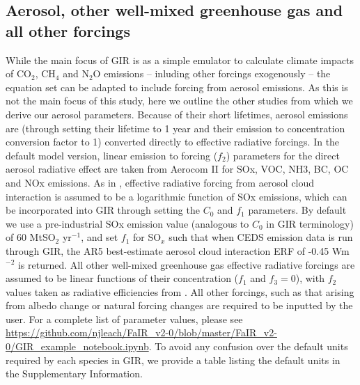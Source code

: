 \documentclass[gmd, manuscript]{copernicus}
\begin{document}
\subsection*{Aerosol, other well-mixed greenhouse gas and all other forcings}
While the main focus of GIR is as a simple emulator to calculate climate impacts of CO$_2$, CH$_4$ and N$_2$O emissions -- inluding other forcings exogenously -- the equation set can be adapted to include forcing from aerosol emissions. As this is not the main focus of this study, here we outline the other studies from which we derive our aerosol parameters. Because of their short lifetimes, aerosol emissions are (through setting their lifetime to 1 year and their emission to concentration conversion factor to 1) converted directly to effective radiative forcings. In the default model version, linear emission to forcing ($f_2$) parameters for the direct aerosol radiative effect are taken from Aerocom II \citep{Myhre2013a} for SOx, VOC, NH3, BC, OC and NOx emissions. As in \cite{Stevens2015}, effective radiative forcing from aerosol cloud interaction is assumed to be a logarithmic function of SOx emissions, which can be incorporated into GIR through setting the $C_0$ and $f_1$ parameters. By default we use a pre-industrial SOx emission value (analogous to $C_0$ in GIR terminology) of 60 MtSO$_2$ yr$^{-1}$, and set $f_1$ for SO$_x$ such that when CEDS emission data is run through GIR, the AR5 best-estimate aerosol cloud interaction ERF of -0.45 Wm$^{-2}$ is returned. All other well-mixed greenhouse gas effective radiative forcings are assumed to be linear functions of their concentration ($f_1$ and $f_3 = 0$), with $f_2$ values taken as radiative efficiencies from \cite{Etminan}.  All other forcings, such as that arising from albedo change or natural forcing changes are required to be inputted by the user. For a complete list of parameter values, please see \url{https://github.com/njleach/FaIR_v2-0/blob/master/FaIR_v2-0/GIR_example_notebook.ipynb}. To avoid any confusion over the default units required by each species in GIR, we provide a table listing the default units in the Supplementary Information.
\end{document}
